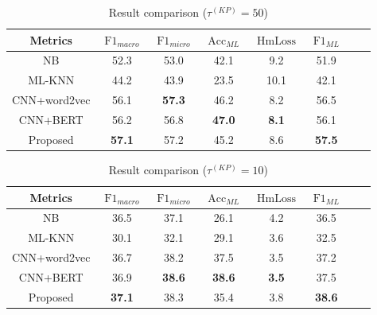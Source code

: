 \begin{table}
	\centering
	\caption{Result comparison (\(\tau^{(KP)}=50 \))}\label{tbl:bsline3}
	\begin{tabular}{cccccccc}
		\toprule
		Metrics      & \(\operatorname{F1}_{macro}\) & \(\operatorname{F1}_{micro}\) & \(\operatorname{Acc}_{ML}\) & \(\operatorname{HmLoss}\) & \(\operatorname{F1}_{ML}\) \\
		\midrule
		NB           & 52.3                          & 53.0                          & 42.1                        & 9.2                       & 51.9                       \\
		ML-KNN       & 44.2                          & 43.9                          & 23.5                        & 10.1                      & 42.1                       \\
		CNN+word2vec & 56.1                          & \textbf{57.3}                 & 46.2                        & 8.2                       & 56.5                       \\
		CNN+BERT     & 56.2                          & 56.8                          & \textbf{47.0}               & \textbf{8.1}              & 56.1                       \\
		Proposed     & \textbf{57.1}                 & 57.2                          & 45.2                        & 8.6                       & \textbf{57.5}              \\
		\bottomrule
	\end{tabular}
\end{table}

\begin{table}
	\centering
	\caption{Result comparison (\(\tau^{(KP)}=10 \))}\label{tbl:bsline4}
	\begin{tabular}{cccccccc}
		\toprule
		Metrics      & \(\operatorname{F1}_{macro}\) & \(\operatorname{F1}_{micro}\) & \(\operatorname{Acc}_{ML}\) & \(\operatorname{HmLoss}\) & \(\operatorname{F1}_{ML}\) \\
		\midrule
		NB           & 36.5                          & 37.1                          & 26.1                        & 4.2                       & 36.5                       \\
		ML-KNN       & 30.1                          & 32.1                          & 29.1                        & 3.6                       & 32.5                       \\
		CNN+word2vec & 36.7                          & 38.2                          & 37.5                        & 3.5                       & 37.2                       \\
		CNN+BERT     & 36.9                          & \textbf{38.6}                 & \textbf{38.6}               & \textbf{3.5}              & 37.5                       \\
		Proposed     & \textbf{37.1}                 & 38.3                          & 35.4                        & 3.8                       & \textbf{38.6}              \\
		\bottomrule
	\end{tabular}
\end{table}

